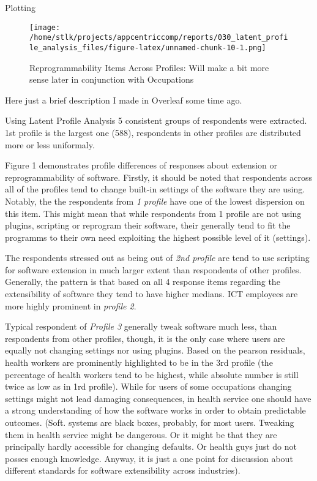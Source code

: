 \documentclass[]{article}
\begin{document}
Plotting

\begin{figure}[htbp]
\centering
\texttt{[image: /home/stlk/projects/appcentriccomp/reports/030\_latent\_profile\_analysis\_files/figure-latex/unnamed-chunk-10-1.png]}
\caption{Reprogrammability Items Across Profiles: Will make a bit more
sense later in conjunction with Occupations}
\end{figure}

Here just a brief description I made in Overleaf some time ago.

Using Latent Profile Analysis 5 consistent groups of respondents were
extracted. 1st profile is the largest one (588), respondents in other
profiles are distributed more or less uniformaly.

Figure 1 demonstrates profile differences of responses about extension
or reprogrammability of software. Firstly, it should be noted that
respondents across all of the profiles tend to change built-in settings
of the software they are using. Notably, the the respondents from
\emph{1 profile} have one of the lowest dispersion on this item. This
might mean that while respondents from 1 profile are not using plugins,
scripting or reprogram their software, their generally tend to fit the
programms to their own need exploiting the highest possible level of it
(settings).

The respondents stressed out as being out of \emph{2nd profile} are tend
to use scripting for software extension in much larger extent than
respondents of other profiles. Generally, the pattern is that based on
all 4 response items regarding the extensibility of software they tend
to have higher medians. ICT employees are more highly prominent in
\emph{profile 2}.

Typical respondent of \emph{Profile 3} generally tweak software much
less, than respondents from other profiles, though, it is the only case
where users are equally not changing settings nor using plugins. Based
on the pearson residuals, health workers are prominently highlighted to
be in the 3rd profile (the percentage of health workers tend to be
highest, while absolute number is still twice as low as in 1rd profile).
While for users of some occupations changing settings might not lead
damaging consequences, in health service one should have a strong
understanding of how the software works in order to obtain predictable
outcomes. (Soft. systems are black boxes, probably, for most users.
Tweaking them in health service might be dangerous. Or it might be that
they are principally hardly accessible for changing defaults. Or health
guys just do not posses enough knowledge. Anyway, it is just a one point
for discussion about different standards for software extensibility
across industries).
\end{document}
